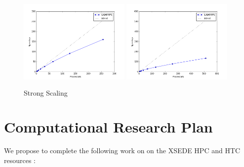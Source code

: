 \documentclass{proposalnsf}
\begin{document}
\begin{figure}
  \begin{center}
    \includegraphics[width=0.48\textwidth]{graphics/strong_tersoff.png}
    \includegraphics[width=0.48\textwidth]{graphics/strong_bks.png}
  \end{center}
  \caption{Strong Scaling}
\end{figure}


\section*{Computational Research Plan}
We propose to complete the following work on on the XSEDE HPC and HTC resources :
\end{document}
